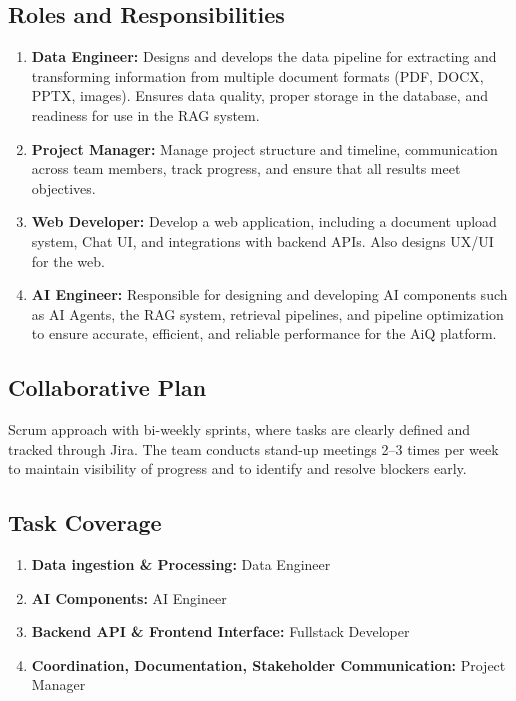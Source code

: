 \documentclass[12pt]{article}
\begin{document}
\subsection{Roles and Responsibilities}
\begin{enumerate}
    \item \textbf{Data Engineer:} Designs and develops the data pipeline for extracting and transforming information from multiple document formats (PDF, DOCX, PPTX, images). Ensures data quality, proper storage in the database, and readiness for use in the RAG system.
    \item \textbf{Project Manager:} Manage project structure and timeline, communication across team members, track progress, and ensure that all results meet objectives.
    \item \textbf{Web Developer:} Develop a web application, including a document upload system, Chat UI, and integrations with backend APIs. Also designs UX/UI for the web.
    \item \textbf{AI Engineer:} Responsible for designing and developing AI components such as AI Agents, the RAG system, retrieval pipelines, and pipeline optimization to ensure accurate, efficient, and reliable performance for the AiQ platform.
\end{enumerate}

\subsection{Collaborative Plan}
Scrum approach with bi-weekly sprints, where tasks are clearly defined and tracked through Jira. The team conducts stand-up meetings 2--3 times per week to maintain visibility of progress and to identify and resolve blockers early.

\subsection{Task Coverage}
\begin{enumerate}
    \item \textbf{Data ingestion \& Processing:} Data Engineer
    \item \textbf{AI Components:} AI Engineer
    \item \textbf{Backend API \& Frontend Interface:} Fullstack Developer
    \item \textbf{Coordination, Documentation, Stakeholder Communication:} Project Manager
\end{enumerate}
\end{document}
